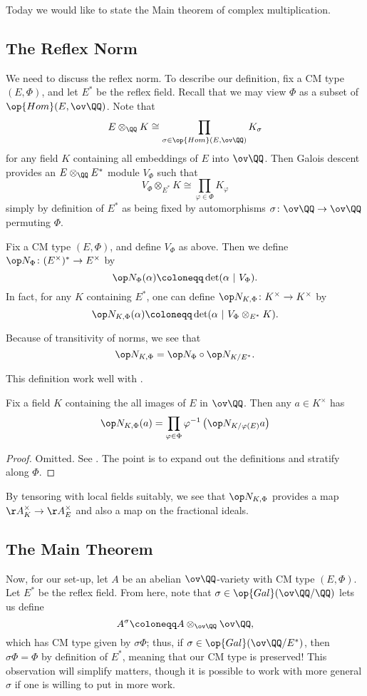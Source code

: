 \documentclass[../notes.tex]{subfiles}
\begin{document}
Today we would like to state the Main theorem of complex multiplication.

\subsection{The Reflex Norm}
We need to discuss the reflex norm. To describe our definition, fix a CM type $(E,\Phi)$, and let $E^*$ be the reflex field. Recall that we may view $\Phi$ as a subset of $\op{Hom}(E,\ov\QQ)$. Note that
\[E\otimes_\QQ K\cong\prod_{\sigma\in\op{Hom}(E,\ov\QQ)}K_\sigma\]
for any field $K$ containing all embeddings of $E$ into $\ov\QQ$. Then Galois descent provides an $E\otimes_\QQ E^*$ module $V_\Phi$ such that
\[V_\Phi\otimes_{E^*}K\cong\prod_{\varphi\in\Phi}K_\varphi\]
simply by definition of $E^*$ as being fixed by automorphisms $\sigma\colon\ov\QQ\to\ov\QQ$ permuting $\Phi$.
\begin{definition}
	Fix a CM type $(E,\Phi)$, and define $V_\Phi$ as above. Then we define $\op N_\Phi\colon(E^\times)^*\to E^\times$ by
	\[\op N_\Phi(\alpha)\coloneqq\det(\alpha~|~V_\Phi).\]
	In fact, for any $K$ containing $E^*$, one can define $\op N_{K,\Phi}\colon K^\times\to K^\times$ by
	\[\op N_{K,\Phi}(\alpha)\coloneqq\det(\alpha~|~V_\Phi\otimes_{E^*}K).\]
\end{definition}
\begin{remark}
	Because of transitivity of norms, we see that
	\[{\op N_{K,\Phi}}={\op N_\Phi}\circ{\op N_{K/E^*}}.\]
\end{remark}
This definition work well with .
\begin{proposition}
	Fix a field $K$ containing the all images of $E$ in $\ov\QQ$. Then any $a\in K^\times$ has
	\[\op N_{K,\Phi}(a)=\prod_{\varphi\in\Phi}\varphi^{-1}\left(\op N_{K/\varphi(E)}a\right)\]
\end{proposition}
\begin{proof}
	Omitted. See \cite[Proposition~1.26]{milne-cm}. The point is to expand out the definitions and stratify along $\Phi$.
\end{proof}
\begin{remark}
	By tensoring with local fields suitably, we see that $\op N_{K,\Phi}$ provides a map $\AA_K^\times\to\AA_E^\times$ and also a map on the fractional ideals.
\end{remark}

\subsection{The Main Theorem}
Now, for our set-up, let $A$ be an abelian $\ov\QQ$-variety with CM type $(E,\Phi)$. Let $E^*$ be the reflex field. From here, note that $\sigma\in\op{Gal}(\ov\QQ/\QQ)$ lets us define
\[A^\sigma\coloneqq A\otimes_{\ov\QQ}\ov\QQ,\]
which has CM type given by $\sigma\Phi$; thus, if $\sigma\in\op{Gal}(\ov\QQ/E^*)$, then $\sigma\Phi=\Phi$ by definition of $E^*$, meaning that our CM type is preserved! This observation will simplify matters, though it is possible to work with more general $\sigma$ if one is willing to put in more work.
\end{document}
